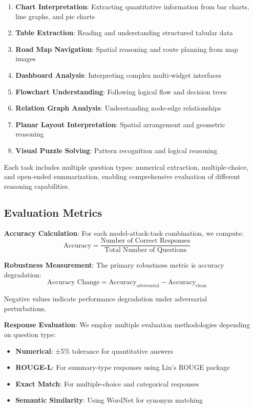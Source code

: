 \begin{enumerate}
    \item \textbf{Chart Interpretation}: Extracting quantitative information from bar charts, line graphs, and pie charts
    \item \textbf{Table Extraction}: Reading and understanding structured tabular data
    \item \textbf{Road Map Navigation}: Spatial reasoning and route planning from map images
    \item \textbf{Dashboard Analysis}: Interpreting complex multi-widget interfaces
    \item \textbf{Flowchart Understanding}: Following logical flow and decision trees
    \item \textbf{Relation Graph Analysis}: Understanding node-edge relationships
    \item \textbf{Planar Layout Interpretation}: Spatial arrangement and geometric reasoning
    \item \textbf{Visual Puzzle Solving}: Pattern recognition and logical reasoning
\end{enumerate}

Each task includes multiple question types: numerical extraction, multiple-choice, and open-ended summarization, enabling comprehensive evaluation of different reasoning capabilities.

\subsection{Evaluation Metrics}

\textbf{Accuracy Calculation}: For each model-attack-task combination, we compute:
\begin{equation}
\text{Accuracy} = \frac{\text{Number of Correct Responses}}{\text{Total Number of Questions}}
\end{equation}

\textbf{Robustness Measurement}: The primary robustness metric is accuracy degradation:
\begin{equation}
\text{Accuracy Change} = \text{Accuracy}_{\text{adversarial}} - \text{Accuracy}_{\text{clean}}
\end{equation}

Negative values indicate performance degradation under adversarial perturbations.

\textbf{Response Evaluation}: We employ multiple evaluation methodologies depending on question type:
\begin{itemize}
    \item \textbf{Numerical}: ±5\% tolerance for quantitative answers
    \item \textbf{ROUGE-L}: For summary-type responses using Lin's ROUGE package \cite{lin2014rouge}
    \item \textbf{Exact Match}: For multiple-choice and categorical responses
    \item \textbf{Semantic Similarity}: Using WordNet \cite{miller1995wordnet} for synonym matching
\end{itemize}

